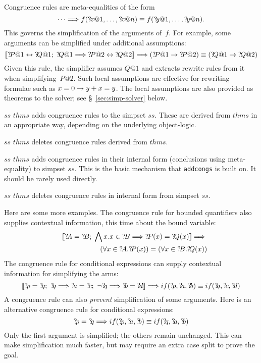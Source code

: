 Congruence rules are meta-equalities of the form
\[ \dots \Longrightarrow
   f({?\!x@1},\ldots,{?\!x@n}) \equiv f({?\!y@1},\ldots,{?\!y@n}).
\]
This governs the simplification of the arguments of~$f$.  For
example, some arguments can be simplified under additional assumptions:
\[ \List{\Var{P@1} \bimp \Var{Q@1};\; \Var{Q@1} \Imp \Var{P@2} \bimp \Var{Q@2}}
   \Imp (\Var{P@1} \imp \Var{P@2}) \equiv (\Var{Q@1} \imp \Var{Q@2})
\]
Given this rule, the simplifier assumes $Q@1$ and extracts rewrite
rules from it when simplifying~$P@2$.  Such local assumptions are
effective for rewriting formulae such as $x=0\rightarrow y+x=y$.  The local
assumptions are also provided as theorems to the solver; see
\S~\ref{sec:simp-solver} below.

\begin{ttdescription}
  
\item[$ss$ \ttindexbold{addcongs} $thms$] adds congruence rules to the
  simpset $ss$.  These are derived from $thms$ in an appropriate way,
  depending on the underlying object-logic.
  
\item[$ss$ \ttindexbold{delcongs} $thms$] deletes congruence rules
  derived from $thms$.
  
\item[$ss$ \ttindexbold{addeqcongs} $thms$] adds congruence rules in
  their internal form (conclusions using meta-equality) to simpset
  $ss$.  This is the basic mechanism that \texttt{addcongs} is built
  on.  It should be rarely used directly.
  
\item[$ss$ \ttindexbold{deleqcongs} $thms$] deletes congruence rules
  in internal form from simpset $ss$.
  
\end{ttdescription}

\medskip

Here are some more examples.  The congruence rule for bounded
quantifiers also supplies contextual information, this time about the
bound variable:
\begin{eqnarray*}
  &&\List{\Var{A}=\Var{B};\; 
          \Forall x. x\in \Var{B} \Imp \Var{P}(x) = \Var{Q}(x)} \Imp{} \\
 &&\qquad\qquad
    (\forall x\in \Var{A}.\Var{P}(x)) = (\forall x\in \Var{B}.\Var{Q}(x))
\end{eqnarray*}
The congruence rule for conditional expressions can supply contextual
information for simplifying the arms:
\[ \List{\Var{p}=\Var{q};~ \Var{q} \Imp \Var{a}=\Var{c};~
         \lnot\Var{q} \Imp \Var{b}=\Var{d}} \Imp
   if(\Var{p},\Var{a},\Var{b}) \equiv if(\Var{q},\Var{c},\Var{d})
\]
A congruence rule can also {\em prevent\/} simplification of some arguments.
Here is an alternative congruence rule for conditional expressions:
\[ \Var{p}=\Var{q} \Imp
   if(\Var{p},\Var{a},\Var{b}) \equiv if(\Var{q},\Var{a},\Var{b})
\]
Only the first argument is simplified; the others remain unchanged.
This can make simplification much faster, but may require an extra case split
to prove the goal.  


